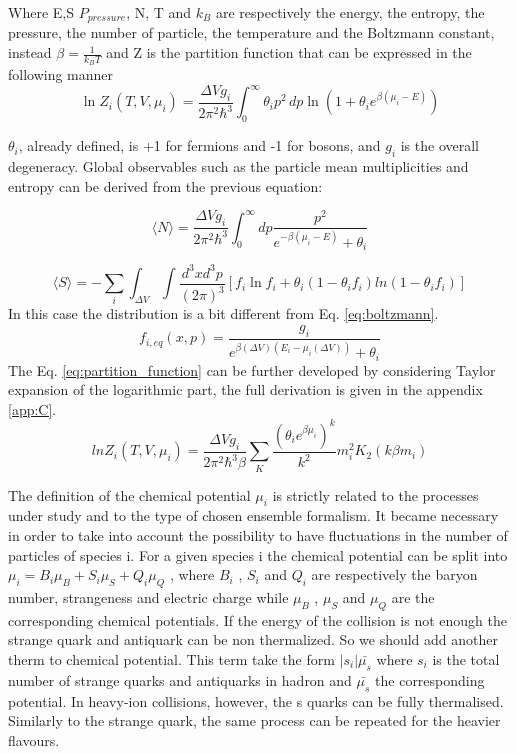 \documentclass[12pt,a4paper]{book}
\begin{document}
	
	Where E,S $P_{pressure}$, N, T and $k_B$ are respectively the energy, the entropy, the pressure, the number of particle, the temperature and the Boltzmann constant, instead $\beta=\frac{1}{k_BT}$ and Z is the partition function that can be expressed in the following manner
\begin{equation}
	\boxed{
		\ln Z_i(T,V,\mu_i) = \frac{\Delta V g_i}{2\pi^2 \hbar^3} \int_{0}^{\infty} \theta_i p^2 \, dp \ln \left( 1 + \theta_i e^{\beta(\mu_i - E)} \right) }
	\label{eq:partition_function}
\end{equation}

$\theta_i$, already defined, is +1 for fermions and -1 for bosons, and $g_i$ is the overall degeneracy. Global observables such as the particle mean multiplicities and entropy can be derived from the previous equation:

\begin{equation}
	\boxed{
		\langle N \rangle = \frac{\Delta V g_i}{2\pi^2 \hbar^3} \int_{0}^{\infty} dp \frac{p^2}{e^{-\beta(\mu_i - E)} + \theta_i}}
	\label{eq:mean_particle_number}
\end{equation}

	\begin{equation}
		\langle S \rangle= -\sum_{i} \int_{\Delta V} \int \frac{d^3x d^3p}{(2\pi)^3} \left[f_i \ln f_i + \theta_i (1-\theta_if_i)ln(1-\theta_if_i) \right]
		\label{eq:entropy}
	\end{equation}
	In this case the distribution is a bit different from Eq. \ref{eq:boltzmann}.
	\begin{equation}
		f_{i,eq}(x,p)=\frac{g_i}{e^{\beta(\Delta V)(E_i-\mu_i(\Delta V))} +\theta_i} 
		\label{eq:boltmann2}
	\end{equation}
	The Eq. \ref{eq:partition_function} can be further developed by considering  Taylor expansion of the logarithmic part, the full derivation is given in the appendix \ref{app:C}.
	\begin{equation}
		ln Z_i(T,V,\mu_i)= \frac{\Delta V g_i}{2\pi^2\hbar^3\beta} \sum_{K} \frac{(\theta_i e^{\beta \mu_i})^k}{k^2} m_i^2K_2(k\beta m_i)
		\label{eq:partition_function2}
	\end{equation}
	
	The definition of the chemical potential $\mu_i$ is strictly related to the processes under study and to the type of chosen ensemble formalism. It became necessary in order to take into account the possibility to have fluctuations in the number of particles of species i. For a given species i the chemical potential can be split into $\mu_i = B_i \mu_B + S_i \mu_S + Q_i \mu_Q$ , where $B_i$ , $S_i$ and $Q_i$ are respectively the baryon number, strangeness and electric charge while $\mu_B$ , $\mu_S$ and $\mu_Q$ are the corresponding chemical potentials. If the energy of the collision is not enough the strange quark and antiquark can be non thermalized. So we should add another therm to chemical potential. This term take the form $|s_i| \bar{\mu_s}$ where $s_i$ is the total number of strange quarks and antiquarks in hadron and $\bar{\mu_s}$ the corresponding potential. In heavy-ion collisions, however, the s quarks can be fully thermalised. Similarly to the strange quark, the same process can be repeated for the heavier flavours.
	
\end{document}
